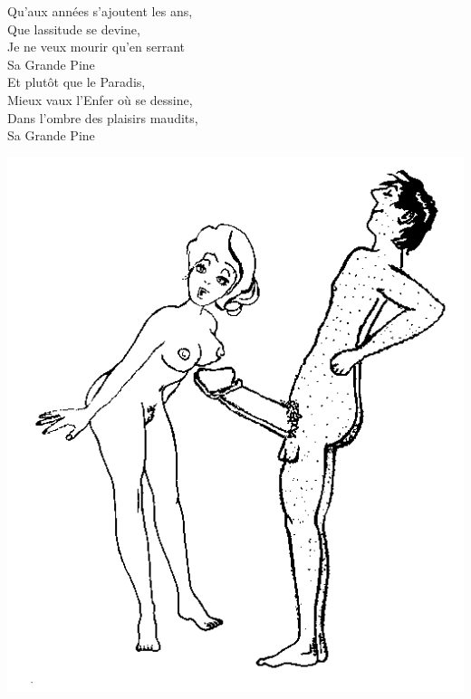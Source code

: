 \breakpage
Qu'aux années s'ajoutent les ans,
\\Que lassitude se devine,
\\Je ne veux mourir qu'en serrant
\\Sa Grande Pine
\\Et plutôt que le Paradis,
\\Mieux vaux l'Enfer où se dessine,
\\Dans l'ombre des plaisirs maudits,
\\Sa Grande Pine
\begin{center}
\includegraphics[width=1\textwidth]{images/grande_pine.png}
\end{center}

\breakpage